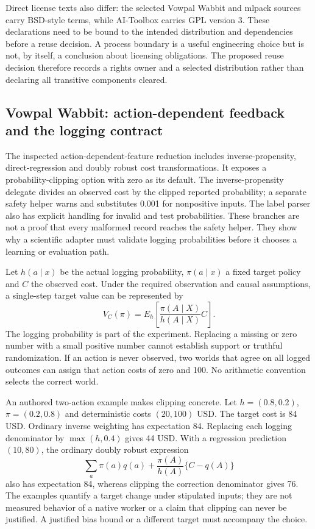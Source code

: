 Direct license texts also differ: the selected Vowpal Wabbit and mlpack sources carry BSD-style terms, while AI-Toolbox carries GPL version 3. These declarations need to be bound to the intended distribution and dependencies before a reuse decision. A process boundary is a useful engineering choice but is not, by itself, a conclusion about licensing obligations. The proposed reuse decision therefore records a rights owner and a selected distribution rather than declaring all transitive components cleared.\citep{exec24_policycxx_vw,exec24_policycxx_aitoolbox,exec24_policycxx_mlpack,exec24_policycxx_comparison}

\subsection{Vowpal Wabbit: action-dependent feedback and the logging contract}
The inspected action-dependent-feature reduction includes inverse-propensity, direct-regression and doubly robust cost transformations. It exposes a probability-clipping option with zero as its default. The inverse-propensity delegate divides an observed cost by the clipped reported probability; a separate safety helper warns and substitutes 0.001 for nonpositive inputs. The label parser also has explicit handling for invalid and test probabilities. These branches are not a proof that every malformed record reaches the safety helper. They show why a scientific adapter must validate logging probabilities before it chooses a learning or evaluation path.\citep{exec24_policycxx_vw}

Let $h(a\mid x)$ be the actual logging probability, $\pi(a\mid x)$ a fixed target policy and $C$ the observed cost. Under the required observation and causal assumptions, a single-step target value can be represented by
\[
 V_C(\pi)=E_h\!\left[\frac{\pi(A\mid X)}{h(A\mid X)}C\right].
\]
The logging probability is part of the experiment. Replacing a missing or zero number with a small positive number cannot establish support or truthful randomization. If an action is never observed, two worlds that agree on all logged outcomes can assign that action costs of zero and 100. No arithmetic convention selects the correct world.\citep{exec24_policycxx_cs2021,exec24_policycxx_anytime2024,exec24_policycxx_comparison}

An authored two-action example makes clipping concrete. Let $h=(0.8,0.2)$, $\pi=(0.2,0.8)$ and deterministic costs $(20,100)$ USD. The target cost is 84 USD. Ordinary inverse weighting has expectation 84. Replacing each logging denominator by $\max(h,0.4)$ gives 44 USD. With a regression prediction $(10,80)$, the ordinary doubly robust expression
\[
 \sum_a\pi(a)q(a)+\frac{\pi(A)}{h(A)}\{C-q(A)\}
\]
also has expectation 84, whereas clipping the correction denominator gives 76. The examples quantify a target change under stipulated inputs; they are not measured behavior of a native worker or a claim that clipping can never be justified. A justified bias bound or a different target must accompany the choice.\citep{exec24_policycxx_comparison}

